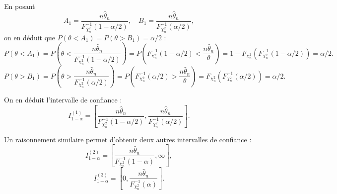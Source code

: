 {\begin{enumerate}
{En posant
\begin{equation}
    A_1 = \frac{n\hat{\theta}_n}{F^{-1}_{\chi^2_n}(1 - \alpha/2)}, \quad B_1 = \frac{n\hat{\theta}_n}{F^{-1}_{\chi^2_n}(\alpha/2)},
\end{equation}
on en déduit que $P(\theta < A_1) = P(\theta > B_1) = \alpha/2$ :
\begin{equation}
    P(\theta < A_1) = P\left(\theta < \frac{n\hat{\theta}_n}{F^{-1}_{\chi^2_n}(1 - \alpha/2)}\right) = P\left(F^{-1}_{\chi^2_n}(1 - \alpha/2) < \frac{n\hat{\theta}_n}{\theta}\right) = 1 - F_{\chi^2_n}\left(F^{-1}_{\chi^2_n}(1 - \alpha/2)\right) = \alpha/2.
\end{equation}
\begin{equation}
    P(\theta > B_1) = P\left(\theta > \frac{n\hat{\theta}_n}{F^{-1}_{\chi^2_n}(\alpha/2)}\right) = P\left(F^{-1}_{\chi^2_n}(\alpha/2) > \frac{n\hat{\theta}_n}{\theta}\right) = F_{\chi^2_n}\left(F^{-1}_{\chi^2_n}(\alpha/2)\right) = \alpha/2.
\end{equation}

On en déduit l’intervalle de confiance :
\begin{equation}
    I^{(1)}_{1 - \alpha} = \left[ \frac{n\hat{\theta}_n}{F^{-1}_{\chi^2_n}(1 - \alpha/2)}, \frac{n\hat{\theta}_n}{F^{-1}_{\chi^2_n}(\alpha/2)} \right].
\end{equation}

Un raisonnement similaire permet d'obtenir deux autres intervalles de confiance :
\begin{equation}
    I^{(2)}_{1 - \alpha} = \left[ \frac{n\hat{\theta}_n}{F^{-1}_{\chi^2_n}(1 - \alpha)}, \infty \right],
\end{equation}
\begin{equation}
    I^{(3)}_{1 - \alpha} = \left[ 0, \frac{n\hat{\theta}_n}{F^{-1}_{\chi^2_n}(\alpha)} \right].
\end{equation}

}
\end{enumerate}}
